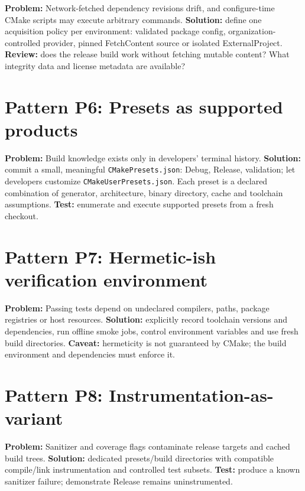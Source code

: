 \documentclass[11pt,letterpaper,oneside]{report}
\providecommand{\passthrough}[1]{#1}
\begin{document}
\textbf{Problem:} Network-fetched dependency revisions drift, and
configure-time CMake scripts may execute arbitrary commands.
\textbf{Solution:} define one acquisition policy per environment:
validated package config, organization-controlled provider, pinned
FetchContent source or isolated ExternalProject. \textbf{Review:} does
the release build work without fetching mutable content? What integrity
data and license metadata are available?

\section{Pattern P6: Presets as supported
products}\label{pattern-p6-presets-as-supported-products}

\textbf{Problem:} Build knowledge exists only in developers' terminal
history. \textbf{Solution:} commit a small, meaningful
\passthrough{\lstinline!CMakePresets.json!}: Debug, Release, validation;
let developers customize
\passthrough{\lstinline!CMakeUserPresets.json!}. Each preset is a
declared combination of generator, architecture, binary directory, cache
and toolchain assumptions. \textbf{Test:} enumerate and execute
supported presets from a fresh checkout.

\section{Pattern P7: Hermetic-ish verification
environment}\label{pattern-p7-hermetic-ish-verification-environment}

\textbf{Problem:} Passing tests depend on undeclared compilers, paths,
package registries or host resources. \textbf{Solution:} explicitly
record toolchain versions and dependencies, run offline smoke jobs,
control environment variables and use fresh build directories.
\textbf{Caveat:} hermeticity is not guaranteed by CMake; the build
environment and dependencies must enforce it.

\section{Pattern P8:
Instrumentation-as-variant}\label{pattern-p8-instrumentation-as-variant}

\textbf{Problem:} Sanitizer and coverage flags contaminate release
targets and cached build trees. \textbf{Solution:} dedicated
presets/build directories with compatible compile/link instrumentation
and controlled test subsets. \textbf{Test:} produce a known sanitizer
failure; demonstrate Release remains uninstrumented.
\end{document}

